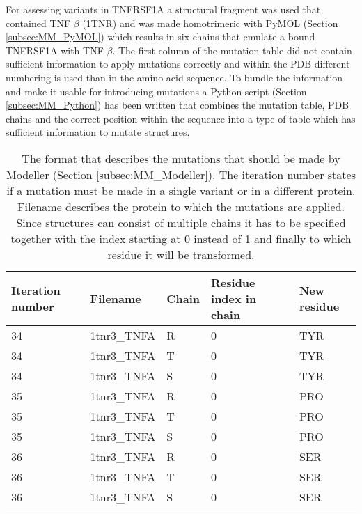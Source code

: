 	For assessing variants in TNFRSF1A a structural fragment was used that contained TNF $\beta$ (1TNR) \cite{} and was made homotrimeric with PyMOL (Section \ref{subsec:MM_PyMOL}) which results in six chains that emulate a bound TNFRSF1A with TNF $\beta$. The first column of the mutation table did not contain sufficient information to apply mutations correctly and within the PDB different numbering is used than in the amino acid sequence. To bundle the information and make it usable for introducing mutations a Python script (Section \ref{subsec:MM_Python}) has been written that combines the mutation table, PDB chains and the correct position within the sequence into a type of table which has sufficient information to mutate structures.  
	\begin{table}[ht]
		\begin{tabular}{ l | l | l | l | l}
			Iteration number & Filename & Chain & Residue index in chain & New residue\\ \hline
			34 & 1tnr3\_TNFA & R & 0 & TYR\\
			34 & 1tnr3\_TNFA & T & 0 & TYR\\
			34 & 1tnr3\_TNFA & S & 0 & TYR\\
			35 & 1tnr3\_TNFA & R & 0 & PRO\\
			35 & 1tnr3\_TNFA & T & 0 & PRO\\
			35 & 1tnr3\_TNFA & S & 0 & PRO\\
			36 & 1tnr3\_TNFA & R & 0 & SER\\
			36 & 1tnr3\_TNFA & T & 0 & SER\\
			36 & 1tnr3\_TNFA & S & 0 & SER\\
		\end{tabular}
		\caption{The format that describes the mutations that should be made by Modeller (Section \ref{subsec:MM_Modeller}). The iteration number states if a mutation must be made in a single variant or in a different protein. Filename describes the protein to which the mutations are applied. Since structures can consist of multiple chains it has to be specified together with the index starting at 0 instead of 1 and finally to which residue it will be transformed.}
			\label{table:Res_Modeller_Mutation_Format}
	\end{table}

